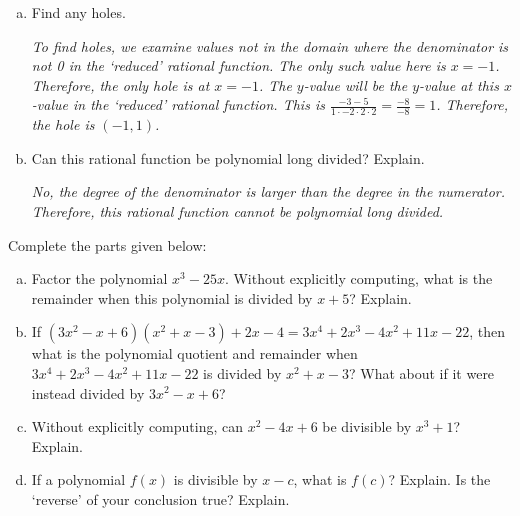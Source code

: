 \documentclass[11pt,letterpaper]{article}
\begin{document}
\begin{enumerate}[(a)]
	\item Find any holes. \par
	{\itshape To find holes, we examine values not in the domain where the denominator is not 0 in the `reduced' rational function. The only such value here is $x= -1$. Therefore, the only hole is at $x= -1$. The $y$-value will be the $y$-value at this $x$-value in the `reduced' rational function. This is $\tfrac{-3 - 5}{1 \cdot -2 \cdot 2 \cdot 2}= \tfrac{-8}{-8}= 1$. Therefore, the hole is $(-1, 1)$.} \vfill
	
	\item Can this rational function be polynomial long divided? Explain. \par
	{\itshape No, the degree of the denominator is larger than the degree in the numerator. Therefore, this rational function cannot be polynomial long divided.}
	\end{enumerate} \vfill



\newpage



 Complete the parts given below:
	\begin{enumerate}[(a)]
	\item Factor the polynomial $x^3 - 25x$. Without explicitly computing, what is the remainder when this polynomial is divided by $x + 5$? Explain.
	\item If $(3x^2 - x + 6) (x^2 + x - 3) + 2 x - 4= 3x^4 + 2x^3 - 4x^2 + 11x - 22$, then what is the polynomial quotient and remainder when $3x^4 + 2x^3 - 4x^2 + 11x - 22$ is divided by $x^2 + x - 3$? What about if it were instead divided by $3x^2 - x + 6$?
	\item Without explicitly computing, can $x^2 - 4x + 6$ be divisible by $x^3 + 1$? Explain. 
	\item If a polynomial $f(x)$ is divisible by $x - c$, what is $f(c)$? Explain. Is the `reverse' of your conclusion true? Explain.
	\end{enumerate} \par\vspace{0.3cm}

\end{document}
